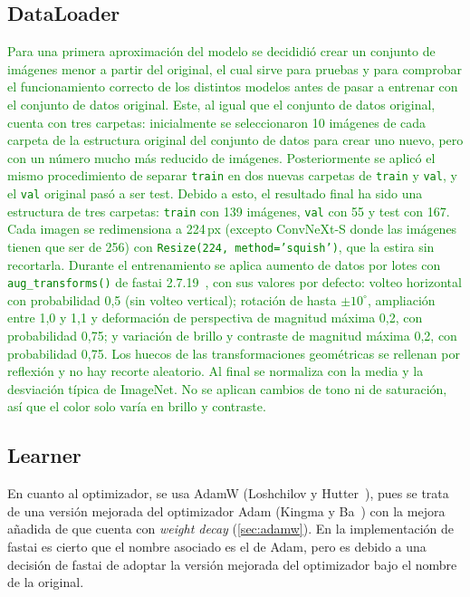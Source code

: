 \subsection{DataLoader}\label{sec:dataloader}
\textcolor{green}{
Para una primera aproximación del modelo se decididió crear un conjunto de imágenes menor a partir del original, el cual sirve para pruebas y para comprobar el funcionamiento correcto de los distintos modelos antes de pasar a entrenar con el conjunto de datos original. Este, al igual que el conjunto de datos original, cuenta con tres carpetas: inicialmente se seleccionaron 10 imágenes de cada carpeta de la estructura original del conjunto de datos para crear uno nuevo, pero con un número mucho más reducido de imágenes. Posteriormente se aplicó el mismo procedimiento de separar \texttt{train} en dos nuevas carpetas de \texttt{train} y \texttt{val}, y el \texttt{val} original pasó a ser test. Debido a esto, el resultado final ha sido una estructura de tres carpetas: \texttt{train} con 139 imágenes, \texttt{val} con 55 y test con 167.
Cada imagen se redimensiona a 224\,px (excepto ConvNeXt-S donde las imágenes tienen que ser de 256) con \texttt{Resize(224, method='squish')}, que la estira sin recortarla. Durante el entrenamiento se aplica aumento de datos por lotes con \texttt{aug\_transforms()} de fastai 2.7.19~\cite{howard2020fastai}, con sus valores por defecto: volteo horizontal con probabilidad 0,5 (sin volteo vertical); rotación de hasta $\pm 10^\circ$, ampliación entre 1,0 y 1,1 y deformación de perspectiva de magnitud máxima 0,2, con probabilidad 0,75; y variación de brillo y contraste de magnitud máxima 0,2, con probabilidad 0,75. Los huecos de las transformaciones geométricas se rellenan por reflexión y no hay recorte aleatorio. Al final se normaliza con la media y la desviación típica de ImageNet. No se aplican cambios de tono ni de saturación, así que el color solo varía en brillo y contraste.
}
\subsection{Learner}\label{sec:learner}

En cuanto al optimizador, se usa AdamW (Loshchilov y Hutter~\cite{loshchilov2019}), pues se trata de una versión mejorada del optimizador Adam (Kingma y Ba~\cite{kingma2014}) con la mejora añadida de que cuenta con \emph{weight decay} (\cref{sec:adamw}). En la implementación de fastai es cierto que el nombre asociado es el de Adam, pero es debido a una decisión de fastai de adoptar la versión mejorada del optimizador bajo el nombre de la original.

